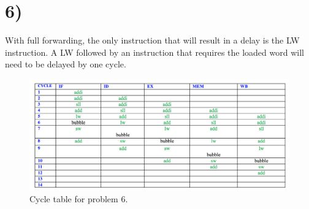 \documentclass[a4paper,11pt]{article}
\begin{document}

\section*{6)}
With full forwarding, the only instruction that will result in a delay is the LW instruction.  A LW followed by an instruction that
requires the loaded word will need to be delayed by one cycle. 

\begin{figure}[h!]
\caption{Cycle table for problem 6.} 
\centering
\includegraphics[width=1.1\textwidth]{hw6_p6.png}
\end{figure}

\end{document}
